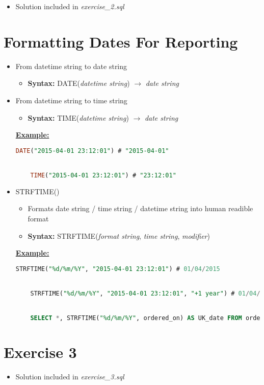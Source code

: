 \documentclass[12pt]{article}
\begin{document}
\bigskip

\begin{itemize}
    \item Solution included in \textit{exercise\_2.sql}
\end{itemize}

\bigskip

\section{Formatting Dates For Reporting}

\bigskip

\begin{itemize}
    \item From datetime string to date string
    \begin{itemize}
        \item \textbf{Syntax:} DATE(\textit{datetime string}) $\to$ \textit{date string}
    \end{itemize}
    \item From datetime string to time string
    \begin{itemize}
        \item \textbf{Syntax:} TIME(\textit{datetime string}) $\to$ \textit{date string}
    \end{itemize}

    \bigskip

    \underline{\textbf{Example:}}

    \bigskip

    \begin{lstlisting}[language=SQL]
    DATE("2015-04-01 23:12:01") # "2015-04-01"


    TIME("2015-04-01 23:12:01") # "23:12:01"
    \end{lstlisting}


    \item STRFTIME()
    \begin{itemize}
        \item Formats date string / time string / datetime string into human readible format
        \item \textbf{Syntax:} STRFTIME(\textit{format string}, \textit{time string}, \textit{modifier})
    \end{itemize}

    \bigskip

    \underline{\textbf{Example:}}

    \bigskip

    \begin{lstlisting}[language=SQL]
    STRFTIME("%d/%m/%Y", "2015-04-01 23:12:01") # 01/04/2015


    STRFTIME("%d/%m/%Y", "2015-04-01 23:12:01", "+1 year") # 01/04/2016


    SELECT *, STRFTIME("%d/%m/%Y", ordered_on) AS UK_date FROM orders;
    \end{lstlisting}
\end{itemize}


\bigskip

\section{Exercise 3}

\bigskip

\begin{itemize}
    \item Solution included in \textit{exercise\_3.sql}
\end{itemize}

\bigskip
\end{document}
